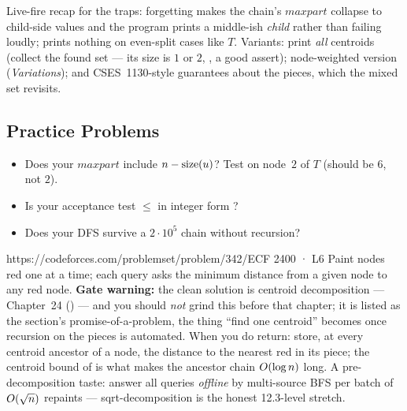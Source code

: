 
\begin{warningbox}
Live-fire recap for the traps: forgetting  makes the chain's
$\mathit{maxpart}$ collapse to child-side values and the program prints a middle-ish
\emph{child} rather than failing loudly;  prints nothing on even-split
cases like $T$. Variants: print \emph{all} centroids (collect the found set --- its size
is $1$ or $2$, , a good assert); node-weighted version
(\emph{Variations}); and CSES~1130-style guarantees about the pieces, which the mixed
set revisits.
\end{warningbox}

\subsection{Practice Problems}

\begin{stuckbox}
\begin{itemize}[nosep, leftmargin=1.4em]
  \item Does your $\mathit{maxpart}$ include $n - \operatorname{size}(u)$? Test on node~$2$ of $T$
        (should be $6$, not $2$).
  \item Is your acceptance test $\le$ in integer form ?
  \item Does your DFS survive a $2\cdot 10^{5}$ chain without recursion?
\end{itemize}
\end{stuckbox}

\begin{practiceset}
    {https://codeforces.com/problemset/problem/342/E}{CF 2400 · L6}
    {Paint nodes red one at a time; each query asks the minimum distance from a given
    node to any red node. \textbf{Gate warning:} the clean solution is centroid
    decomposition --- Chapter~24 () --- and you should \emph{not} grind this
    before that chapter; it is listed as the section's promise-of-a-problem, the thing
    ``find one centroid'' becomes once recursion on the pieces is automated. When you
    do return: store, at every centroid ancestor of a node, the distance to the nearest
    red in its piece; the centroid bound of  is what makes the
    ancestor chain $O(\log n)$ long. A pre-decomposition taste: answer all queries
    \emph{offline} by multi-source BFS per batch of $O(\sqrt{n})$ repaints ---
    sqrt-decomposition is the honest 12.3-level stretch.}
\end{practiceset}

